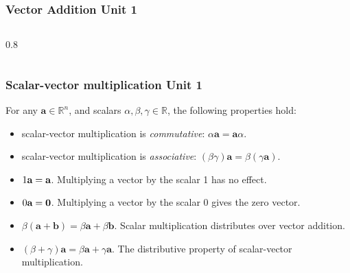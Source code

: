\documentclass[12pt]{beamer}
\newcommand{\FrameTitle}[2]{\frametitle{#1 \hfill \small\textnormal{\textcolor{midgray}{#2}}}}
\newcommand{\Vector}[1]{\textbf{#1}}
\newcommand{\Scalar}[1]{\textnormal{#1}}
\begin{document}
\begin{frame}\FrameTitle{Vector Addition}{Unit 1}
    \begin{columns}[c]
        \begin{column}{0.8\textwidth}
            \begin{center}
            \end{center}
        \end{column}
    \end{columns}
\end{frame}


\begin{frame}\FrameTitle{Scalar-vector multiplication}{Unit 1}
    For any $\Vector{a} \in \mathbb{R}^n$, and scalars $\alpha, \beta, \gamma \in \mathbb{R}$,
    the following properties hold:
    \begin{itemize}
        \item scalar-vector multiplication is \emph{commutative}: $\alpha \Vector{a} = \Vector{a} \alpha$.
        \item scalar-vector multiplication is \emph{associative}: $(\beta \gamma) \Vector{a} = \beta (\gamma \Vector{a})$.
        \item $\Scalar{1} \Vector{a} = \Vector{a}$. Multiplying a vector by the scalar 1 has no effect.
        \item $\Scalar{0} \Vector{a} = \Vector{0}$. Multiplying a vector by the scalar 0 gives the zero vector.
        \item $\beta (\Vector{a} + \Vector{b}) = \beta \Vector{a} + \beta \Vector{b}$. Scalar multiplication distributes over vector addition.
        \item $(\beta + \gamma) \Vector{a} = \beta \Vector{a} + \gamma \Vector{a}$. The distributive property of scalar-vector multiplication.

    \end{itemize}
\end{frame}
\end{document}
